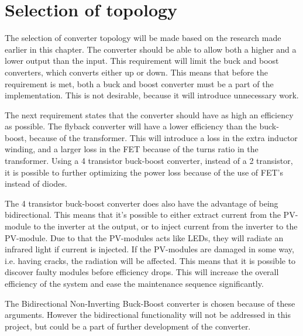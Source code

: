 \section{Selection of topology}\label{selection_of_topology}
The selection of converter topology will be made based on the research made earlier in this chapter. The converter should be able to allow both a higher and a lower output than the input. This requirement will limit the buck and boost converters, which converts either up or down. This means that before the requirement is met, both a buck and boost converter must be a part of the implementation. This is not desirable, because it will introduce unnecessary work.  

The next requirement states that the converter should have as high an efficiency as possible. The flyback converter will have a lower efficiency than the buck-boost, because of the transformer. This will introduce a loss in the extra inductor winding, and a larger loss in the FET because of the turns ratio in the transformer. Using a 4 transistor buck-boost converter, instead of a 2 transistor, it is possible to further optimizing the power loss because of the use of FET's instead of diodes. 

The 4 transistor buck-boost converter does also have the advantage of being bidirectional. This means that it's possible to either extract current from the PV-module to the inverter at the output, or to inject current from the inverter to the PV-module. Due to that the PV-modules acts like LEDs, they will radiate an infrared light if current is injected. If the PV-modules are damaged in some way, i.e. having cracks, the radiation will be affected. This means that it is possible to discover faulty modules before efficiency drops. This will increase the overall efficiency of the system and ease the maintenance sequence significantly. 

The Bidirectional Non-Inverting Buck-Boost converter is chosen because of these arguments. However the bidirectional functionality will not be addressed in this project, but could be a part of further development of the converter. 






 